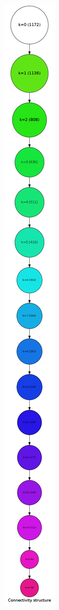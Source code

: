 \begin{landscape}
\begin{figure}[p]
{\includegraphics[scale=0.08]{figures/cohesive_blocks_lenny_1mode}
}
\hspace{.95in}
\end{figure}
\end{landscape}
